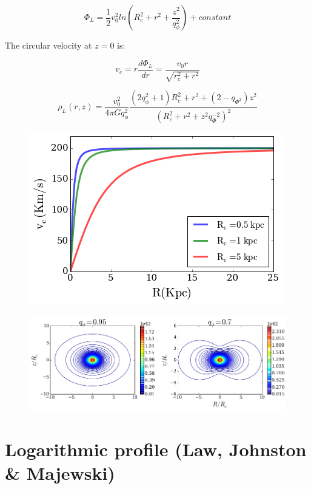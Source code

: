 \documentclass[a4paper, 12pt]{article} %
\begin{document}
\begin{equation}
\Phi_L = \dfrac{1}{2} v_0^2 ln \left( R_c^2 + r^2 + \dfrac{z^2}{q_{\phi}^2}  \right) + constant
\end{equation}

The circular velocity at $z=0$ is:

\begin{equation}
v_c = r \dfrac{d \Phi_L}{dr} = \dfrac{v_0 r}{\sqrt{r_c^2 + r^2}}
\end{equation}

\begin{equation}
\rho_L(r, z) =  \dfrac{v_0^2}{4 \pi G q_{\phi}^2} \dfrac{(2q_{\phi}^2 + 1)R_c^2 + r^2 + (2 - q_{\Phi^2})z^2}{(R_c^2 + r^2 + z^2q_{\Phi}^{-2})^2}
\end{equation}

\begin{figure}
\centering
\includegraphics[scale=0.7]{Log_vc.png}
\end{figure}

\begin{figure}
\centering
\includegraphics[scale=0.7]{MN_logarithmic_contours.png}
\end{figure}


\section{Logarithmic profile (Law, Johnston \& Majewski)}
\end{document}
